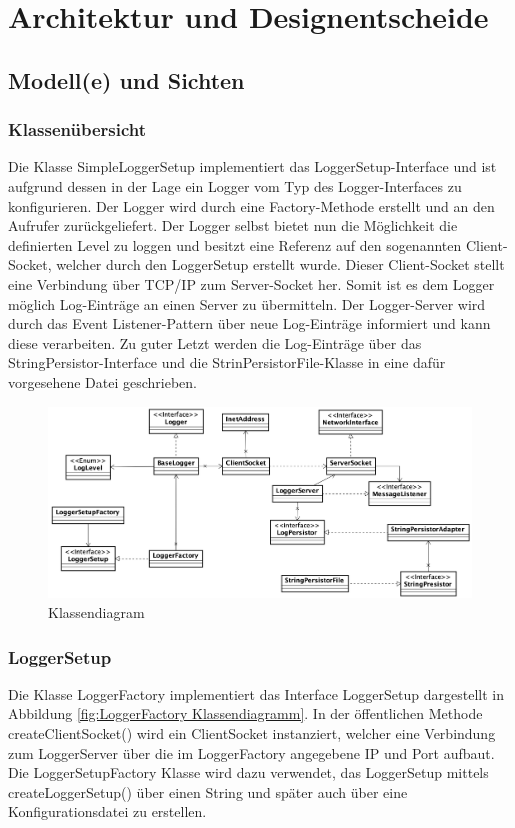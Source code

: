 \section{Architektur und Designentscheide}
\subsection{Modell(e) und Sichten}

\subsubsection{Klassenübersicht}
Die Klasse SimpleLoggerSetup implementiert das LoggerSetup-Interface und ist aufgrund dessen in der Lage ein Logger vom Typ des Logger-Interfaces zu konfigurieren. Der Logger wird durch eine Factory-Methode erstellt und an den Aufrufer zurückgeliefert. Der Logger selbst bietet nun die Möglichkeit die definierten Level zu loggen und besitzt eine Referenz auf den sogenannten Client-Socket, welcher durch den LoggerSetup erstellt wurde. Dieser Client-Socket stellt eine Verbindung über TCP/IP zum Server-Socket her. Somit ist es dem Logger möglich Log-Einträge an einen Server zu übermitteln. Der Logger-Server wird durch das Event Listener-Pattern über neue Log-Einträge informiert und kann diese verarbeiten. Zu guter Letzt werden die Log-Einträge über das StringPersistor-Interface und die StrinPersistorFile-Klasse in eine dafür vorgesehene Datei geschrieben.

\begin{figure}[H]
	\centering
	\includegraphics[width=\textwidth]{2_Architektur/Bilder/classOverview.png}
	\caption{Klassendiagram}
	\label{fig:classdiagram }
\end{figure}


\subsubsection{LoggerSetup}
Die Klasse LoggerFactory implementiert das Interface LoggerSetup dargestellt in Abbildung \ref{fig:LoggerFactory Klassendiagramm}. In der öffentlichen Methode createClientSocket() wird ein ClientSocket instanziert, welcher eine Verbindung zum LoggerServer über die im LoggerFactory angegebene IP und Port aufbaut. Die LoggerSetupFactory Klasse wird dazu verwendet, das LoggerSetup mittels createLoggerSetup() über einen String und später auch über eine Konfigurationsdatei zu erstellen. 

